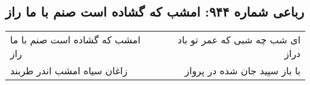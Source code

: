 \begin{center}
\section*{رباعی شماره ۹۴۴: امشب که گشاده است صنم با ما راز}
\label{sec:0944}
\begin{longtable}{l p{0.5cm} r}
امشب که گشاده است صنم با ما راز
&&
ای شب چه شبی که عمر تو باد دراز
\\
زاغان سیاه امشب اندر طربند
&&
با باز سپید جان شده در پرواز
\\
\end{longtable}
\end{center}
